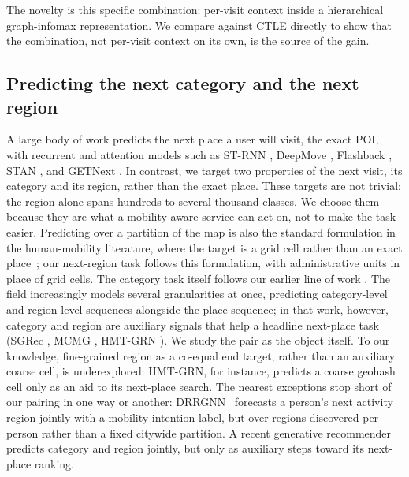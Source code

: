 The novelty is this specific combination: per-visit context inside a
hierarchical graph-infomax representation. We compare against CTLE directly
to show that the combination, not per-visit context on its own, is the source of
the gain.

\subsection{Predicting the next category and the next region}
\label{sec:related-tasks}
A large body of work predicts the next place a user will visit, the exact POI,
with recurrent and attention models such as ST-RNN \cite{liu2016strnn},
DeepMove \cite{feng2018deepmove}, Flashback \cite{yang2020flashback}, STAN
\cite{luo2021stan}, and GETNext \cite{yang2022getnext}. In contrast, we target two properties of the next visit, its category and its
region, rather than the exact place. These targets are not trivial: the region
alone spans hundreds to several thousand classes. We choose them because they are
what a mobility-aware service can act on, not to make the task easier. Predicting
over a partition of the map is also the standard formulation in the human-mobility
literature, where the target is a grid cell rather than an exact
place~\cite{luca2021mobilitysurvey}; our next-region task follows this
formulation, with administrative units in place of grid cells. The category
task itself follows our earlier line of work \cite{silva2025mtlnet}. The field
increasingly models several granularities at once, predicting category-level and
region-level sequences alongside the place sequence; in that work, however,
category and region are auxiliary signals that help a headline next-place task
(SGRec \cite{li2021sgrec}, MCMG \cite{sun2024mcmg}, HMT-GRN \cite{lim2022hmtgrn}).
We study the pair as the object itself. To our knowledge, fine-grained region as a
co-equal end target, rather than an auxiliary coarse cell, is underexplored:
HMT-GRN, for instance, predicts a coarse geohash cell only as an aid to its
next-place search. The nearest exceptions stop short of our pairing in one way or
another: DRRGNN~\cite{zhu2022drrgnn} forecasts a person's next activity region
jointly with a mobility-intention label, but over regions discovered per person
rather than a fixed citywide partition. A recent generative
recommender~\cite{sun2025kgtb} predicts category and region jointly, but only as
auxiliary steps toward its next-place ranking.

